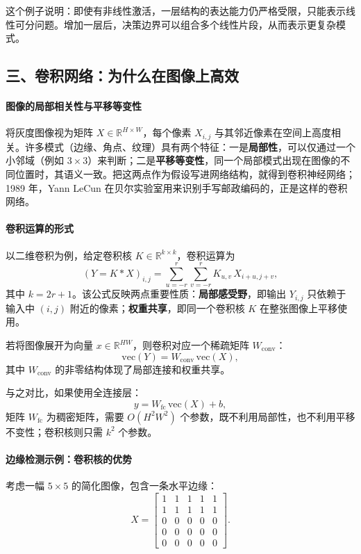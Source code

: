 这个例子说明：即使有非线性激活，一层结构的表达能力仍严格受限，只能表示线性可分问题。增加一层后，决策边界可以组合多个线性片段，从而表示更复杂模式。

\subsection*{三、卷积网络：为什么在图像上高效}

\paragraph{图像的局部相关性与平移等变性}

将灰度图像视为矩阵 $X \in \mathbb{R}^{H\times W}$，每个像素 $X_{i,j}$ 与其邻近像素在空间上高度相关。许多模式（边缘、角点、纹理）具有两个特征：一是\textbf{局部性}，可以仅通过一个小邻域（例如 $3\times 3$）来判断；二是\textbf{平移等变性}，同一个局部模式出现在图像的不同位置时，其语义一致。把这两点作为假设写进网络结构，就得到卷积神经网络；1989 年，Yann LeCun 在贝尔实验室用来识别手写邮政编码的，正是这样的卷积网络。

\paragraph{卷积运算的形式}

以二维卷积为例，给定卷积核 $K\in\mathbb{R}^{k\times k}$，卷积运算为
\[
(Y = K * X)_{i,j} = \sum_{u=-r}^r \sum_{v=-r}^r K_{u,v}\, X_{i+u, j+v},
\]
其中 $k = 2r+1$。该公式反映两点重要性质：\textbf{局部感受野}，即输出 $Y_{i,j}$ 只依赖于输入中 $(i,j)$ 附近的像素；\textbf{权重共享}，即同一个卷积核 $K$ 在整张图像上平移使用。

若将图像展开为向量 $x\in\mathbb{R}^{HW}$，则卷积对应一个稀疏矩阵 $W_{\text{conv}}$：
\[
\text{vec}(Y) = W_{\text{conv}}\, \text{vec}(X),
\]
其中 $W_{\text{conv}}$ 的非零结构体现了局部连接和权重共享。

与之对比，如果使用全连接层：
\[
y = W_{\text{fc}}\, \text{vec}(X) + b,
\]
矩阵 $W_{\text{fc}}$ 为稠密矩阵，需要 $O(H^2 W^2)$ 个参数，既不利用局部性，也不利用平移不变性；卷积核则只需 $k^2$ 个参数。

\paragraph{边缘检测示例：卷积核的优势}

考虑一幅 $5\times 5$ 的简化图像，包含一条水平边缘：
\[
X = \begin{bmatrix} 1 & 1 & 1 & 1 & 1\\ 1 & 1 & 1 & 1 & 1\\ 0 & 0 & 0 & 0 & 0\\ 0 & 0 & 0 & 0 & 0\\ 0 & 0 & 0 & 0 & 0 \end{bmatrix}.
\]

